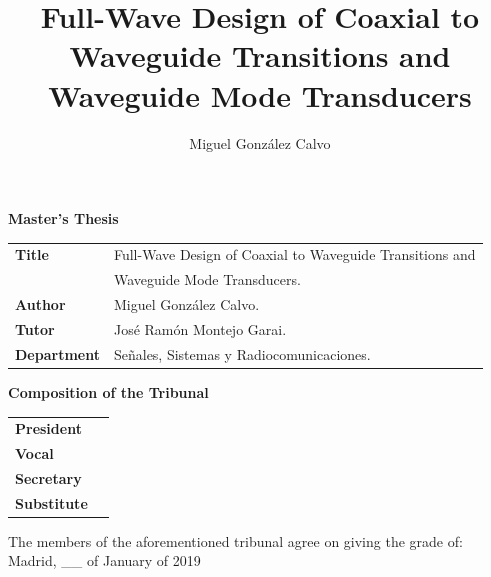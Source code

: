 \documentclass[english,twoside]{article}
\title{Full-Wave Design of Coaxial to Waveguide Transitions and Waveguide Mode Transducers}
\author{Miguel González Calvo}
\begin{document}
	
	\newpage
	
	\thispagestyle{empty}
	\Large \textbf{Master's Thesis}
	\normalsize
	
	\vspace{20pt}
	
	\begin{tabular}{ll}
		\textbf{Title} & Full-Wave Design of Coaxial to Waveguide Transitions and\\ & Waveguide Mode Transducers. \\[2ex]
		\textbf{Author}  & Miguel González Calvo. \\[2ex]
		\textbf{Tutor} & José Ramón Montejo Garai. \\[2ex]
		\textbf{Department}	& Señales, Sistemas y Radiocomunicaciones.
	\end{tabular}

	\vspace{40pt}
	\Large \textbf{Composition of the Tribunal}
	\normalsize
	\vspace{20pt}
	
	\begin{tabular}{ll}
		\textbf{President} & \\[2ex]
		\textbf{Vocal} & \\[2ex]
		\textbf{Secretary} & \\[2ex]
		\textbf{Substitute} & 
	\end{tabular}
	
	\vspace{40pt}
	The members of the aforementioned tribunal agree on giving the grade of: \\
	
	\vspace{40pt}
	\hfill Madrid, \_\_ of January of 2019
	
	
	
	
	
	
	
	\thispagestyle{empty} 
	\clearpage \mbox{} \clearpage
	
\end{document}
